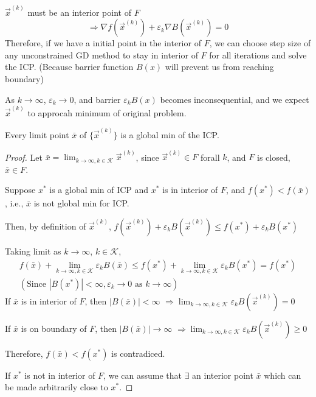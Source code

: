 \documentclass[11pt]{elegantbook}
\begin{document}
$\vec{x}^{(k)}$ must be an interior point of $F$
$$\Rightarrow \nabla f(\vec{x}^{(k)})+\varepsilon_k \nabla B(\vec{x}^{(k)})=0$$
Therefore, if we have a initial point in the interior of $F$, we can choose step size of any unconstrained GD method to stay in interior of $F$ for all iterations and solve the ICP. (Because barrier function $B(x)$ will prevent us from reaching boundary)

As $k \rightarrow \infty$, $\varepsilon_k \rightarrow 0$, and barrier $\varepsilon_k B(x)$ becomes inconsequential, and we expect $\vec{x}^{(k)}$ to approcah minimum of original problem.

\begin{proposition}
    Every limit point $\bar{x}$ of $\{\vec{x}^{(k)}\}$ is a global min of the ICP.
\end{proposition}
\begin{proof}
Let $\bar{x}=\lim_{k \rightarrow \infty, k\in \mathcal{K}}\vec{x}^{(k)}$, since $\vec{x}^{(k)}\in F$ forall $k$, and $F$ is closed, $\bar{x}\in F$.

Suppose $x^*$ is a global min of ICP and $x^*$ is in interior of $F$, and $f(x^*)<f(\bar{x})$, i.e., $\bar{x}$ is not global min for ICP.

Then, by definition of $\vec{x}^{(k)}$, $f(\vec{x}^{(k)})+\varepsilon_k B(\vec{x}^{(k)})\leq f(x^*)+\varepsilon_k B(x^*)$

Taking limit as $k \rightarrow \infty$, $k\in \mathcal{K}$,
\begin{equation}
    \begin{aligned}
        f(\bar{x})+\lim_{k \rightarrow \infty, k\in \mathcal{K}}\varepsilon_k B(\bar{x})\leq f(x^*)+\lim_{k \rightarrow \infty, k\in \mathcal{K}}\varepsilon_k B(x^*)=f(x^*)\\
        (\text{Since }|B(x^*)|<\infty,\varepsilon_k \rightarrow	0\text{ as }k \rightarrow \infty)
    \end{aligned}
    \nonumber
\end{equation}
If $\bar{x}$ is in interior of $F$, then $|B(\bar{x})|<\infty$ $\Rightarrow \lim_{k \rightarrow \infty, k\in \mathcal{K}}\varepsilon_k B(\vec{x}^{(k)})=0$

If $\bar{x}$ is on boundary of $F$, then $|B(\bar{x})| \rightarrow \infty$ $\Rightarrow \lim_{k \rightarrow \infty, k\in \mathcal{K}}\varepsilon_k B(\vec{x}^{(k)})\geq 0$

Therefore, $f(\bar{x})<f(x^*)$ is contradiced.

If $x^*$ is not in interior of $F$, we can assume that $\exists$ an interior point $\bar{x}$ which can be made arbitrarily close to $x^*$.
\end{proof}
\end{document}

